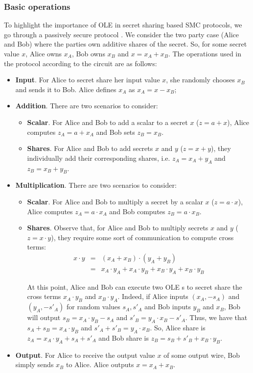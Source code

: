 \subsubsection{Basic operations}

To highlight the importance of OLE in secret sharing based SMC protocols, we go through a passively secure protocol \cite{Evans2018}. We consider the two party case (Alice and Bob) where the parties own additive shares of the secret. So, for some secret value $x$, Alice owns $x_A$, Bob owns $x_B$ and $x = x_A + x_B$. The operations used in the protocol according to the circuit are as follows:

\begin{itemize}
	\item \textbf{Input}. For Alice to secret share her input value $x$, she randomly chooses $x_B$ and sends it to Bob. Alice defines $x_A$ as $x_A = x - x_B$;
	\item \textbf{Addition}. There are two scenarios to consider:
	\begin{itemize}
		\item \textbf{Scalar}. For Alice and Bob to add a scalar to a secret $x$ ($z = a + x$), Alice computes $z_A = a + x_A$ and Bob sets $z_B = x_B$.
		\item \textbf{Shares}. For Alice and Bob to add secrets $x$ and $y$ ($z = x+y$), they individually add their corresponding shares, i.e. $z_A = x_A + y_A$ and $z_B = x_B + y_B$.
	\end{itemize}
	\item \textbf{Multiplication}. There are two scenarios to consider:
		\begin{itemize}
		\item \textbf{Scalar}. For Alice and Bob to multiply a secret by a scalar $x$ ($z = a \cdot x$), Alice computes $z_A = a \cdot x_A$ and Bob computes $z_B = a \cdot x_B$.
		\item \textbf{Shares}. Observe that, for Alice and Bob to multiply secrets $x$ and $y$ ($z = x\cdot y$), they require some sort of communication to compute cross terms:
		\begin{eqnarray}
		x\cdot y &=& (x_A + x_B)\cdot (y_A + y_B)\\
		&=& x_A\cdot y_A + x_A\cdot y_B + x_B \cdot y_A + x_B\cdot y_B
		\end{eqnarray}
		
		At this point, Alice and Bob can execute two OLE s to secret share the cross terms $x_A\cdot y_B$ and $x_B \cdot y_A$. Indeed, if Alice inputs $(x_A, - s_A)$ and $(y_A, - s'_A)$ for random values $s_A, s'_A$ and Bob inputs $y_B$ and $x_B$, Bob will output $s_B = x_A \cdot y_B - s_A$ and $s'_B = y_A \cdot x_B - s'_A$. Thus, we have that $s_A + s_B = x_A \cdot y_B$ and $s'_A + s'_B = y_A \cdot x_B$. So, Alice share is $z_A = x_A\cdot y_A + s_A + s'_A$ and Bob share is $z_B =  s_B + s'_B + x_B\cdot y_B$.  
	\end{itemize}
	\item \textbf{Output}. For Alice to receive the output value $x$ of some output wire, Bob simply sends $x_B$ to Alice. Alice outputs $x = x_A + x_B$.
\end{itemize}



